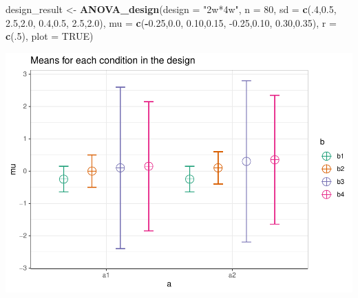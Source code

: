 \documentclass[]{book}
\newenvironment{Shaded}{\begin{snugshade}}{\end{snugshade}}
\newcommand{\DataTypeTok}[1]{\textcolor[rgb]{0.13,0.29,0.53}{#1}}
\newcommand{\DecValTok}[1]{\textcolor[rgb]{0.00,0.00,0.81}{#1}}
\newcommand{\FloatTok}[1]{\textcolor[rgb]{0.00,0.00,0.81}{#1}}
\newcommand{\KeywordTok}[1]{\textcolor[rgb]{0.13,0.29,0.53}{\textbf{#1}}}
\newcommand{\NormalTok}[1]{#1}
\newcommand{\OperatorTok}[1]{\textcolor[rgb]{0.81,0.36,0.00}{\textbf{#1}}}
\newcommand{\OtherTok}[1]{\textcolor[rgb]{0.56,0.35,0.01}{#1}}
\newcommand{\StringTok}[1]{\textcolor[rgb]{0.31,0.60,0.02}{#1}}
\begin{document}
\begin{Shaded}
\begin{Highlighting}[]
\NormalTok{design_result <-}\StringTok{ }\KeywordTok{ANOVA_design}\NormalTok{(}\DataTypeTok{design =} \StringTok{"2w*4w"}\NormalTok{,}
                              \DataTypeTok{n =} \DecValTok{80}\NormalTok{,}
                              \DataTypeTok{sd =} \KeywordTok{c}\NormalTok{(.}\DecValTok{4}\NormalTok{,}\FloatTok{0.5}\NormalTok{, }
                                     \FloatTok{2.5}\NormalTok{,}\FloatTok{2.0}\NormalTok{, }
                                     \FloatTok{0.4}\NormalTok{,}\FloatTok{0.5}\NormalTok{, }
                                     \FloatTok{2.5}\NormalTok{,}\FloatTok{2.0}\NormalTok{),}
                              \DataTypeTok{mu =} \KeywordTok{c}\NormalTok{(}\OperatorTok{-}\FloatTok{0.25}\NormalTok{,}\FloatTok{0.0}\NormalTok{, }
                                     \FloatTok{0.10}\NormalTok{,}\FloatTok{0.15}\NormalTok{, }
                                     \FloatTok{-0.25}\NormalTok{,}\FloatTok{0.10}\NormalTok{, }
                                     \FloatTok{0.30}\NormalTok{,}\FloatTok{0.35}\NormalTok{),}
                              \DataTypeTok{r =} \KeywordTok{c}\NormalTok{(.}\DecValTok{5}\NormalTok{),}
                              \DataTypeTok{plot =} \OtherTok{TRUE}\NormalTok{)}
\end{Highlighting}
\end{Shaded}

\includegraphics{SuperpowerValidation_files/figure-latex/aberson_6.8-1.pdf}

\begin{Shaded}
\end{Shaded}
\end{document}

